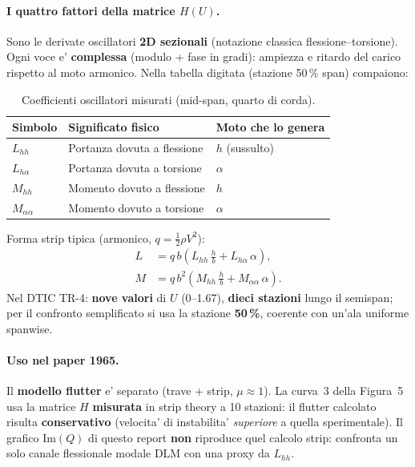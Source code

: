 \documentclass[11pt,a4paper]{article}
\begin{document}
\paragraph{I quattro fattori della matrice $H(U)$.}
Sono le derivate oscillatori \textbf{2D sezionali} (notazione classica flessione--torsione).
Ogni voce e' \textbf{complessa} (modulo + fase in gradi): ampiezza e ritardo del carico
rispetto al moto armonico. Nella tabella digitata (stazione 50\,\% span) compaiono:

\begin{table}[H]
  \centering
  \caption{Coefficienti oscillatori misurati (mid-span, quarto di corda).}
  \label{tab:H-coeffs}
  \begin{tabular}{lll}
    \toprule
    Simbolo & Significato fisico & Moto che lo genera \\
    \midrule
    $L_{hh}$ & Portanza dovuta a flessione & $h$ (sussulto) \\
    $L_{h\alpha}$ & Portanza dovuta a torsione & $\alpha$ \\
    $M_{hh}$ & Momento dovuto a flessione & $h$ \\
    $M_{\alpha\alpha}$ & Momento dovuto a torsione & $\alpha$ \\
    \bottomrule
  \end{tabular}
\end{table}

Forma strip tipica (armonico, $q=\tfrac{1}{2}\rho V^2$):
\begin{align}
  L &= q\,b\left(L_{hh}\,\frac{h}{b} + L_{h\alpha}\,\alpha\right), \\
  M &= q\,b^2\left(M_{hh}\,\frac{h}{b} + M_{\alpha\alpha}\,\alpha\right).
\end{align}
Nel DTIC TR-4: \textbf{nove valori} di $U$ (0--1.67), \textbf{dieci stazioni} lungo il
semispan; per il confronto semplificato si usa la stazione \textbf{50\,\%}, coerente con
un'ala uniforme spanwise.

\paragraph{Uso nel paper 1965.}
Il \textbf{modello flutter} e' separato (trave + strip, $\mu\approx 1$).
La curva~3 della Figura~5 usa la matrice $H$ \textbf{misurata} in strip theory a 10 stazioni:
il flutter calcolato risulta \textbf{conservativo} (velocita' di instabilita' \emph{superiore}
a quella sperimentale). Il grafico $\mathrm{Im}(Q)$ di questo report \textbf{non} riproduce
quel calcolo strip: confronta un solo canale flessionale modale DLM con una proxy da $L_{hh}$.
\end{document}
